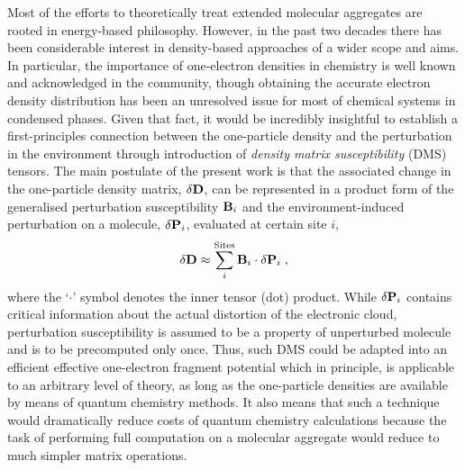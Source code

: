 \documentclass[aip,amsmath,amssymb,reprint,floatfix]{revtex4-1}
\begin{document}
Most of the efforts to theoretically treat extended molecular aggregates are rooted in energy\hyp{}based 
philosophy. However, in the past two decades there has been considerable interest in density\hyp{}based approaches
of a wider scope and aims.\cite{Yang.Lee.JCP.1995,
Mukamel.Berman.JCP.2003,
Piquemal.Cisneros.Reinhardt.Gresh.Darden.JCP.2006,
Elliott.Burke.Cohen.Wasserman.PhysRevA.2010,
Mandado.Hermida-Ramon.JCTC.2011,Sun.Chan.ACR.2016,Hedegard.Reiher.JCTC.2016} 
In particular, the importance of one\hyp{}electron densities in chemistry is well known and acknowledged 
in the community,\cite{Holas.March.PhysRevA.1991,Yang.PhysRevLett.1991,Yang.Lee.JCP.1995} 
though obtaining the accurate electron density distribution 
has been an unresolved issue for most of chemical systems in condensed phases. Given that fact, it would be 
incredibly insightful to establish a first\hyp{}principles connection between the one\hyp{}particle density 
and the perturbation in the environment through introduction of \emph{density matrix susceptibility} (DMS) tensors. 
The main postulate of the present work is that the associated change in the one\hyp{}particle density matrix, 
$\delta {\bf D}$, can be represented in a product form of the generalised perturbation susceptibility ${\bf B}_i$
and the environment\hyp{}induced perturbation on a molecule, $\delta {\bf P}_i$, evaluated at certain site $i$,
%
\begin{equation*} \label{e:initial-model}
  \delta {\bf D} \approx \sum_i^{\text{Sites}} {\bf B}_i
  \cdot  \delta {\bf P}_i \;,
\end{equation*}
%
where the `$\cdot$' symbol denotes the inner tensor (dot) product.
While $\delta {\bf P}_i$ contains critical information about the actual distortion of the electronic cloud,
perturbation susceptibility is assumed to be a property of unperturbed molecule and is to be precomputed only once. 
Thus, such DMS could be adapted into an efficient effective one\hyp{}electron fragment potential which in principle, 
is applicable to an arbitrary level of theory, as long as the one\hyp{}particle densities are available by means of
quantum chemistry methods. It also means that such a technique would dramatically reduce costs of quantum chemistry 
calculations because the task of performing full computation on a molecular aggregate would reduce to much simpler
matrix operations.
\end{document}
